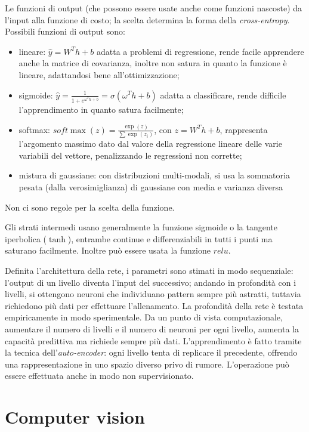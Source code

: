 \documentclass[11pt, a4page]{article}
\begin{document}
Le funzioni di output (che possono essere usate anche come funzioni nascoste) da l'input alla funzione di costo; la scelta determina la forma della \textit{cross-entropy}.
Possibili funzioni di output sono:
\begin{itemize}[noitemsep]
\item lineare: $\hat{y} = W^Th + b$ adatta a problemi di regressione, rende facile apprendere anche la matrice di covarianza, inoltre non satura in quanto la funzione è lineare, adattandosi bene all'ottimizzazione;
\item sigmoide: $\hat{y} = \frac{1}{1 + e^{\omega^Th + b}} = \sigma(\omega^Th + b)$ adatta a classificare, rende difficile l'apprendimento in quanto satura facilmente;
\item softmax: $soft\max(z) = \frac{\exp(z)}{\sum \exp(z_i)}$, con $z = W^Th + b$, rappresenta l'argomento massimo dato dal valore della regressione lineare delle varie variabili del vettore, penalizzando le regressioni non corrette;
\item mistura di gaussiane: con distribuzioni multi-modali, si usa la sommatoria pesata (dalla verosimiglianza) di gaussiane con media e varianza diversa
\end{itemize}
Non ci sono regole per la scelta della funzione.

Gli strati intermedi usano generalmente la funzione sigmoide o la tangente iperbolica ($\tanh$), entrambe continue e differenziabili in tutti i punti ma saturano facilmente.
Inoltre può essere usata la funzione $relu$.

Definita l'architettura della rete, i parametri sono stimati in modo sequenziale: l'output di un livello diventa l'input del successivo; andando in profondità con i livelli, si ottengono neuroni che individuano pattern sempre più astratti, tuttavia richiedono più dati per effettuare l'allenamento.
La profondità della rete è testata empiricamente in modo sperimentale.
Da un punto di vista computazionale, aumentare il numero di livelli e il numero di neuroni per ogni livello, aumenta la capacità predittiva ma richiede sempre più dati.
L'apprendimento è fatto tramite la tecnica dell'\textit{auto-encoder}: ogni livello tenta di replicare il precedente, offrendo una rappresentazione in uno spazio diverso privo di rumore.
L'operazione può essere effettuata anche in modo non supervisionato.

\newpage
\part{Computer vision}
\end{document}
